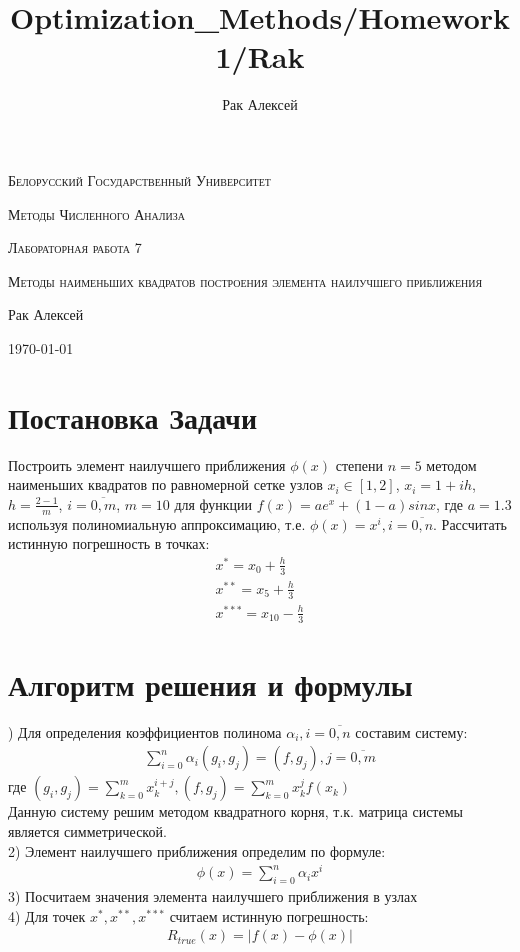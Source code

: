 \documentclass[10pt]{scrartcl}
\begin{document}
\author{Рак Алексей}
\title{Optimization_Methods/Homework1/Rak}
\begin{titlepage}
		\centering
		{\scshape\LARGE Белорусский Государственный Университет \par}
        \vfill
        {\scshape\LARGE Методы Численного Анализа\par}
        \vspace{1cm}
        {\scshape\LARGE Лабораторная работа 7\par}
        \vspace{1cm}
        {\scshape\LARGE Методы наименьших квадратов построения элемента наилучшего приближения\par}
        \vspace{2cm}
        {\LARGE Рак Алексей\par}
        \vfill
        {\large \today}
\end{titlepage}
\section*{Постановка Задачи}\noindent
Построить элемент наилучшего приближения $\phi(x)$ степени $n = 5$ методом наименьших квадратов по
равномерной сетке узлов $x_i \in [1, 2]$, $x_i = 1 + ih$, $h = \frac{2 - 1}{m}$, $i = \overline{0, m}$,
$m = 10$ для функции $f(x) = ae^x + (1 - a)sin x$, где $a = 1.3$ используя полиномиальную аппроксимацию, т.е.
$\phi(x) = x^i, i = \overline{0, n}$. Рассчитать истинную погрешность в точках:
\begin{gather*}
x^* = x_0 + \frac{h}{3}\\
x^{**} = x_5 + \frac{h}{3}\\
x^{***} = x_{10} - \frac{h}{3}
\end{gather*}
\section*{Алгоритм решения и формулы}) Для определения коэффициентов полинома $\alpha_i, i = \overline{0, n}$ составим систему:
\begin{gather*}
\sum_{i = 0}^n \alpha_i (g_i, g_j) = (f, g_j), j = \overline{0, m}
\end{gather*}
где $(g_i, g_j) = \sum_{k = 0}^m x_k^{i + j}, (f, g_j) = \sum_{k = 0}^m x_k^jf(x_k)$\\
Данную систему решим методом квадратного корня, т.к. матрица системы является симметрической.\\
2) Элемент наилучшего приближения определим по формуле:\\
\begin{gather*}
\phi(x) = \sum_{i = 0}^n \alpha_i x^i
\end{gather*}
3) Посчитаем значения элемента наилучшего приближения в узлах\\
4) Для точек $x^*, x^{**}, x^{***}$ считаем истинную погрешность:
\begin{gather*}
R_{true} (x) = |f(x) - \phi(x)|
\end{gather*}
\end{document}
